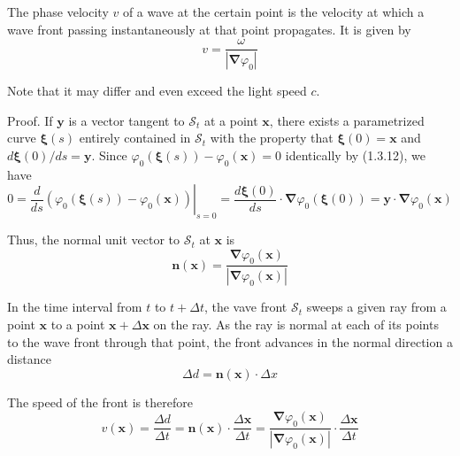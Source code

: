 \documentclass{article}
\begin{document}
The phase velocity $v$ of a wave at the certain point is the velocity at which a wave front passing instantaneously at that point propagates. It is given by
$$
\begin{equation*}
v=\frac{\omega}{\left|\boldsymbol{\nabla} \varphi_{0}\right|} \tag{1.3.13}
\end{equation*}
$$

Note that it may differ and even exceed the light speed $c$.

Proof. If $\boldsymbol{y}$ is a vector tangent to $\mathcal{S}_{t}$ at a point $\boldsymbol{x}$, there exists a parametrized curve $\boldsymbol{\xi}(s)$ entirely contained in $\mathcal{S}_{t}$ with the property that $\boldsymbol{\xi}(0)=\boldsymbol{x}$ and $d \boldsymbol{\xi}(0) / d s=\boldsymbol{y}$. Since
$\varphi_{0}(\boldsymbol{\xi}(s))-\varphi_{0}(\boldsymbol{x})=0$ identically by (1.3.12), we have
$$
\begin{equation*}
0=\left.\frac{d}{d s}\left(\varphi_{0}(\boldsymbol{\xi}(s))-\varphi_{0}(\boldsymbol{x})\right)\right|_{s=0}=\frac{d \boldsymbol{\xi}(0)}{d s} \cdot \boldsymbol{\nabla} \varphi_{0}(\boldsymbol{\xi}(0))=\boldsymbol{y} \cdot \boldsymbol{\nabla} \varphi_{0}(\boldsymbol{x}) \tag{1.3.14}
\end{equation*}
$$

Thus, the normal unit vector to $\mathcal{S}_{t}$ at $\boldsymbol{x}$ is
$$
\begin{equation*}
\boldsymbol{n}(\boldsymbol{x})=\frac{\boldsymbol{\nabla} \varphi_{0}(\boldsymbol{x})}{\left|\boldsymbol{\nabla} \varphi_{0}(\boldsymbol{x})\right|} \tag{1.3.15}
\end{equation*}
$$

In the time interval from $t$ to $t+\Delta t$, the vave front $\mathcal{S}_{t}$ sweeps a given ray from a point $\boldsymbol{x}$ to a point $\boldsymbol{x}+\Delta \boldsymbol{x}$ on the ray. As the ray is normal at each of its points to the wave front through that point, the front advances in the normal direction a distance
$$
\begin{equation*}
\Delta d=\boldsymbol{n}(\boldsymbol{x}) \cdot \Delta x \tag{1.3.16}
\end{equation*}
$$

The speed of the front is therefore
$$
\begin{equation*}
v(\boldsymbol{x})=\frac{\Delta d}{\Delta t}=\boldsymbol{n}(\boldsymbol{x}) \cdot \frac{\Delta \boldsymbol{x}}{\Delta t}=\frac{\boldsymbol{\nabla} \varphi_{0}(\boldsymbol{x})}{\left|\boldsymbol{\nabla} \varphi_{0}(\boldsymbol{x})\right|} \cdot \frac{\Delta \boldsymbol{x}}{\Delta t} \tag{1.3.17}
\end{equation*}
$$
\end{document}
